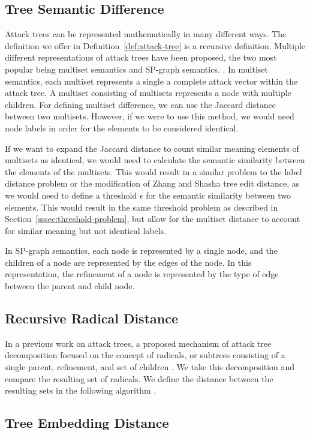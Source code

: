 \subsection{Tree Semantic Difference}

Attack trees can be represented mathematically in many different ways. The definition we offer in Definition~\ref{def:attack-tree} is a recursive definition. Multiple different representations of attack trees have been proposed, the two most popular being multiset semantics and SP-graph semantics. . In multiset semantics, each multiset represents a single a complete attack vector within the attack tree. A multiset consisting of multisets represents a node with multiple children. For defining multiset difference, we can use the Jaccard distance between two multisets. However, if we were to use this method, we would need node labels in order for the elements to be considered identical.

If we want to expand the Jaccard distance to count similar meaning elements of multisets as identical, we would need to calculate the semantic similarity between the elements of the multisets. This would result in a similar problem to the label distance problem or the modification of Zhang and Shasha tree edit distance, as we would need to define a threshold $\epsilon$ for the semantic similarity between two elements. This would result in the same threshold problem as described in Section~\ref{sssec:threshold-problem}, but allow for the multiset distance to account for similar meaning but not identical labels.

In SP-graph semantics, each node is represented by a single node, and the children of a node are represented by the edges of the node. In this representation, the refinement of a node is represented by the type of edge between the parent and child node. 

\subsection{Recursive Radical Distance}

In a previous work on attack trees, a proposed mechanism of attack tree decomposition focused on the concept of radicals, or subtrees consisting of a single parent, refinement, and set of children . We take this decomposition and compare the resulting set of radicals. We define the distance between the resulting sets in the following algorithm .



\subsection{Tree Embedding Distance}

